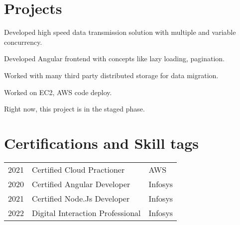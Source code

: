 \documentclass[]{deedy-resume-openfont}
\begin{document}
\begin{minipage}[t]{0.66\textwidth}
\section{Projects}

\begin{tightemize}
\item Developed high speed data transmission solution with multiple and variable concurrency.
\item Developed Angular frontend with concepts like lazy loading, pagination.
\item Worked with many third party distributed storage for data migration.
\item Worked on EC2, AWS code deploy.
\item Right now, this project is in the staged phase.
\end{tightemize}
\sectionsep




\section{Certifications and Skill tags} 

\begin{tabular}{rll}
2021 	& Certified Cloud Practioner    & AWS\\
2020   & Certified Angular Developer   & Infosys\\
2021   & Certified Node.Js Developer  & Infosys\\
2022    & Digital Interaction Professional & Infosys\\

\end{tabular}
\sectionsep

\end{minipage} 
\end{document}
